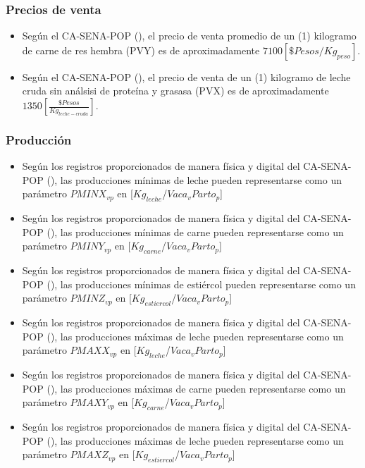 \subsubsection{Precios de venta}
\begin{itemize}
    \item Según el CA-SENA-POP (\cite{casena}), el precio  de venta promedio de un (1) kilogramo de carne de res hembra (PVY) es de aproximadamente $7100[\$Pesos/Kg_{peso}]$. 
    \item Según el CA-SENA-POP (\cite{casena}), el precio de venta de un (1) kilogramo de leche cruda sin análsisi de proteína y grasasa (PVX) es de aproximadamente $1350[\frac{\$Pesos}{Kg_{leche-cruda}}]$.
\end{itemize}

\subsubsection{Producción}
\begin{itemize}
    \item Según los registros proporcionados de manera física y digital del CA-SENA-POP (\cite{casena}), las producciones mínimas de leche pueden representarse como un parámetro $PMINX_{vp}$ en [$Kg_{leche}$/$Vaca_{v}Parto_{p}$]
    \item Según los registros proporcionados de manera física y digital del CA-SENA-POP (\cite{casena}), las producciones mínimas de carne pueden representarse como un parámetro $PMINY_{vp}$ en [$Kg_{carne}$/$Vaca_{v}Parto_{p}$]
    \item Según los registros proporcionados de manera física y digital del CA-SENA-POP (\cite{casena}), las producciones mínimas de estiércol pueden representarse como un parámetro $PMINZ_{vp}$ en [$Kg_{estiercol}$/$Vaca_{v}Parto_{p}$]
    \item Según los registros proporcionados de manera física y digital del CA-SENA-POP (\cite{casena}), las producciones máximas de leche pueden representarse como un parámetro $PMAXX_{vp}$ en [$Kg_{leche}$/$Vaca_{v}Parto_{p}$]
     \item Según los registros proporcionados de manera física y digital del CA-SENA-POP (\cite{casena}), las producciones máximas de carne pueden representarse como un parámetro $PMAXY_{vp}$ en [$Kg_{carne}$/$Vaca_{v}Parto_{p}$]
      \item Según los registros proporcionados de manera física y digital del CA-SENA-POP (\cite{casena}), las producciones máximas de leche pueden representarse como un parámetro $PMAXZ_{vp}$ en [$Kg_{estiercol}$/$Vaca_{v}Parto_{p}$]
\end{itemize}

